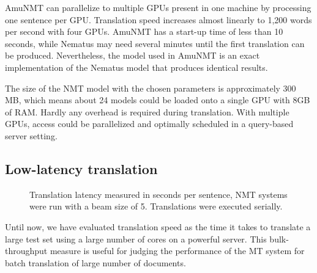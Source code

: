 \documentclass[11pt]{article}
\begin{document}
AmuNMT can parallelize to multiple GPUs present in one machine by processing one sentence per GPU. Translation speed increases almost linearly to 1,200 words per second with four GPUs. 
AmuNMT has a start-up time of less than 10 seconds, while Nematus may need several minutes until the first translation can be produced. Nevertheless, the model used in AmuNMT is an exact implementation of the Nematus model that produces identical results.

The size of the NMT model with the chosen parameters is approximately 300 MB, which means about 24 models could be loaded onto a single GPU with 8GB of RAM. Hardly any overhead is required during translation. With multiple GPUs, access could be parallelized and optimally scheduled in a query-based server setting. 

\subsection{Low-latency translation}

\begin{figure}[t]
\centering
{}
\caption{Translation latency measured in seconds per sentence, NMT systems were run with a beam size of 5. Translations were executed serially.}\label{latency}
\end{figure}

Until now, we have evaluated translation speed as the time it takes to translate a large test set using a large number of cores on a powerful server. This bulk-throughput measure is useful for judging the performance of the MT system for batch translation of large number of documents.
 
\end{document}
